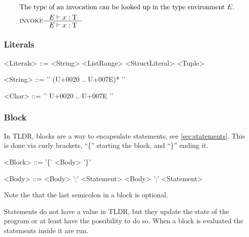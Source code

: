 \begin{align*}
\intertext{The type of an invocation can be looked up in the type environment $E$.}
&\inference[INVOKE]{\Tenv x: \Tt}
                 {\Tenv x: \Tt}
\end{align*}

\subsubsection{Literals}

\begin{grammar}
<Literals> ::= <String>
 \alt <ListRange>
 \alt <StructLiteral>
 \alt <Tuple>

<String> ::= '\textquotedbl' (U+0020 .. U+007E)* '\textquotedbl'

<Char> ::= '\textquotesingle' U+0020 .. U+007E '\textquotesingle'
\end{grammar}

\subsubsection{Block}
In TLDR, blocks are a way to encapsulate statements, see \cref{sec:statements}. This is done via curly brackets, \enquote{\{} starting the block, and \enquote{\}} ending it.

\begin{grammar}
<Block> ::= '\{' <Body> '\}'

<Body> ::= <Body> ';' <Statement>
 \alt <Body> ';'
 \alt <Statement>
\end{grammar}

Note the that the last semicolon in a block is optional.

Statements do not have a value in TLDR, but they update the state of the program or at least have the possibility to do so. When a block is evaluated the statements inside it are run.

